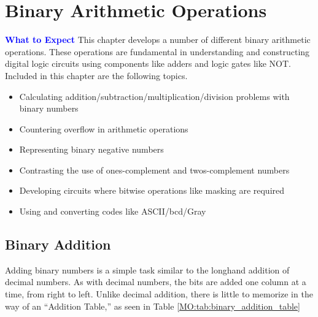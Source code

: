 \chapter{Binary Arithmetic Operations}\label{ch03}

\begin{tcolorbox}[colback=blue!5!white,colframe=blue!75!black]
	\textcolor{blue}{\textbf{What to Expect}}
	\tcblower
	This chapter develops a number of different binary arithmetic operations. These operations are fundamental in understanding and constructing digital logic circuits using components like adders and logic gates like \textsf{NOT}. Included in this chapter are the following topics.

	\begin{itemize}
		\item Calculating addition/subtraction/multiplication/division problems with binary numbers
		\item Countering overflow in arithmetic operations
		\item Representing binary negative numbers
		\item Contrasting the use of ones-complement and twos-complement numbers
		\item Developing circuits where bitwise operations like masking are required
		\item Using and converting codes like ASCII/\gls{bcd}/Gray
	\end{itemize}
\end{tcolorbox}

\section{Binary Addition}

Adding binary numbers is a simple task similar to the longhand addition of decimal numbers. As with decimal numbers, the bits are added one column at a time, from right to left. Unlike decimal addition, there is little to memorize in the way of an ``Addition Table,'' as seen in Table \ref{MO:tab:binary_addition_table}

